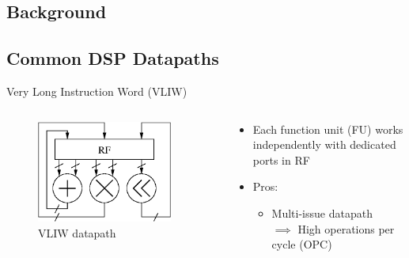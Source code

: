 \documentclass{beamer}
\begin{document}
\begin{CJK}{UTF8}{bkai}
            \section{Background}
            \subsection{Common DSP Datapaths}
            \begin{frame}{Very Long Instruction Word (VLIW)}
                \begin{columns}
                    \begin{column}{0.4\textwidth}
                        \begin{figure}[!ht]
                            \centering
                            \includegraphics[width=0.9\textwidth]{./figs/vliw.eps}
                            \caption{VLIW datapath}
                        \end{figure}
                    \end{column}
                    \begin{column}{0.6\textwidth}
                        \begin{itemize}
                            \item <2-> {Each function unit (FU) works independently with dedicated ports in RF
                                }
                            \item <3-> {Pros:
                                    \begin{itemize}
                                        \item Multi-issue datapath \\ $\implies$ High operations per cycle (OPC)

\end{itemize}}
\end{itemize}
\end{column}
\end{columns}
\end{frame}
\end{CJK}
\end{document}
